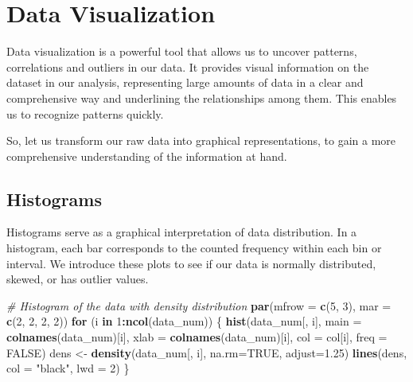 \documentclass[
]{article}
\newenvironment{Shaded}{\begin{snugshade}}{\end{snugshade}}
\newcommand{\AttributeTok}[1]{\textcolor[rgb]{0.13,0.29,0.53}{#1}}
\newcommand{\CommentTok}[1]{\textcolor[rgb]{0.56,0.35,0.01}{\textit{#1}}}
\newcommand{\ConstantTok}[1]{\textcolor[rgb]{0.56,0.35,0.01}{#1}}
\newcommand{\ControlFlowTok}[1]{\textcolor[rgb]{0.13,0.29,0.53}{\textbf{#1}}}
\newcommand{\DecValTok}[1]{\textcolor[rgb]{0.00,0.00,0.81}{#1}}
\newcommand{\FloatTok}[1]{\textcolor[rgb]{0.00,0.00,0.81}{#1}}
\newcommand{\FunctionTok}[1]{\textcolor[rgb]{0.13,0.29,0.53}{\textbf{#1}}}
\newcommand{\NormalTok}[1]{#1}
\newcommand{\OtherTok}[1]{\textcolor[rgb]{0.56,0.35,0.01}{#1}}
\newcommand{\SpecialCharTok}[1]{\textcolor[rgb]{0.81,0.36,0.00}{\textbf{#1}}}
\newcommand{\StringTok}[1]{\textcolor[rgb]{0.31,0.60,0.02}{#1}}
\begin{document}
\section{Data Visualization}\label{data-visualization}

Data visualization is a powerful tool that allows us to uncover
patterns, correlations and outliers in our data. It provides visual
information on the dataset in our analysis, representing large amounts
of data in a clear and comprehensive way and underlining the
relationships among them. This enables us to recognize patterns quickly.

So, let us transform our raw data into graphical representations, to
gain a more comprehensive understanding of the information at hand.

\subsection{Histograms}\label{histograms}

Histograms serve as a graphical interpretation of data distribution. In
a histogram, each bar corresponds to the counted frequency within each
bin or interval. We introduce these plots to see if our data is normally
distributed, skewed, or has outlier values.

\begin{Shaded}
\begin{Highlighting}[]
\CommentTok{\# Histogram of the data with density distribution}
\FunctionTok{par}\NormalTok{(}\AttributeTok{mfrow =} \FunctionTok{c}\NormalTok{(}\DecValTok{5}\NormalTok{, }\DecValTok{3}\NormalTok{), }\AttributeTok{mar =} \FunctionTok{c}\NormalTok{(}\DecValTok{2}\NormalTok{, }\DecValTok{2}\NormalTok{, }\DecValTok{2}\NormalTok{, }\DecValTok{2}\NormalTok{))}
\ControlFlowTok{for}\NormalTok{ (i }\ControlFlowTok{in} \DecValTok{1}\SpecialCharTok{:}\FunctionTok{ncol}\NormalTok{(data\_num)) \{}
  \FunctionTok{hist}\NormalTok{(data\_num[, i], }\AttributeTok{main =} \FunctionTok{colnames}\NormalTok{(data\_num)[i],}
       \AttributeTok{xlab =} \FunctionTok{colnames}\NormalTok{(data\_num)[i], }\AttributeTok{col =}\NormalTok{ col[i], }\AttributeTok{freq =} \ConstantTok{FALSE}\NormalTok{)}
\NormalTok{  dens }\OtherTok{\textless{}{-}} \FunctionTok{density}\NormalTok{(data\_num[, i], }\AttributeTok{na.rm=}\ConstantTok{TRUE}\NormalTok{, }\AttributeTok{adjust=}\FloatTok{1.25}\NormalTok{)}
  \FunctionTok{lines}\NormalTok{(dens, }\AttributeTok{col =} \StringTok{"black"}\NormalTok{, }\AttributeTok{lwd =} \DecValTok{2}\NormalTok{)}
\NormalTok{\}}
\end{Highlighting}
\end{Shaded}
\end{document}

